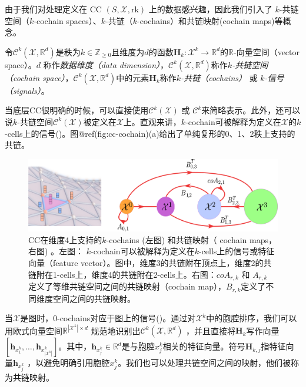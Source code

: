 \documentclass[
  12pt,
]{krantz}
\begin{document}
由于我们对处理定义在 CC \((S,\mathcal{X},\mbox{rk})\)
上的数据感兴趣，因此我们引入了 \(k\)-共链空间（\(k\)-cochain
spaces）、\(k\)-共链（\(k\)-cochains）和共链映射(cochain maps)等概念。

\label{k-cochain-spaces}
令\(\mathcal{C}^k(\mathcal{X},\mathbb{R}^d )\)是秩为\(k \in \mathbb{Z}_{\ge 0}\)且维度为\(d\)的函数\(\mathbf{H}_k\colon\mathcal{X}^k\to \mathbb{R}^d\)的\(\mathbb{R}\)-向量空间（vector
space）。\(d\) 称作\emph{数据维度（data
dimension）}，\(\mathcal{C}^k(\mathcal{X},\mathbb{R}^d)\)称作\emph{\(k\)-共链空间（cochain
space）}，\(\mathcal{C}^k(\mathcal{X},\mathbb{R}^d)\)中的元素\(\mathbf{H}_k\)称作\emph{\(k\)-共链（cochains）}
或 \emph{\(k\)-信号（signals）}。

当底层CC很明确的时候，可以直接使用\(\mathcal{C}^k(\mathcal{X})\) 或
\(\mathcal{C}^k\)来简略表示。此外，还可以说\(k\)-共链空间\(\mathcal{C}^k(\mathcal{X})\)被定义在\(\mathcal{X}\)上。直观来讲，\(k\)-cochain可被解释为定义在\(\mathcal{X}\)的\(k\)-cells上的信号()。图@ref(fig:cc-cochain)(a)给出了单纯复形的0、1、2秩上支持的共链。

\begin{figure}

{\centering \includegraphics{figures/mapping_cochain} 

}

\caption{CC在维度4上支持的$k$-cochains (左图) 和共链映射（ cochain maps，右图) 。左图： $k$-cochain可以被解释为定义在$k$-cells上的信号或特征向量（feature vector）。图中，维度3的共链附在顶点上，维度2的共链附在1-cells上，维度4的共链附在2-cells上。右图：$coA_{r,k}$ 和 $A_{r,k}$ 定义了等维共链空间之间的共链映射（cochain map），$B_{r,k}$定义了不同维度空间之间的共链映射。}\label{fig:cc-cochain}
\end{figure}

当\(\mathcal{X}\)是图时，\(0\)-cochains对应于图上的信号()。通过对\(\mathcal{X}^k\)中的胞腔排序，我们可以用欧式向量空间\(\mathbb{R}^{ |\mathcal{X}^k| \times d}\)
规范地识别出\(\mathcal{C}^k(\mathcal{X},\mathbb{R}^d )\)
，并且直接将\(\mathbf{H}_k\)写作向量\([ \mathbf{h}_{x^k_1},\ldots,\mathbf{h}_{x^k_{|\mathcal{X}^k|} }]\)。其中，\(\mathbf{h}_{x^k_j} \in \mathbb{R}^d\)是与胞腔\(x^k_j\)相关的特征向量。符号\(\mathbf{H}_{k,j}\)指特征向量\(\mathbf{h}_{x^k_j}\)
，以避免明确引用胞腔\(x^k_j\)。我们也可以处理共链空间之间的映射，他们被称为共链映射。
\end{document}
